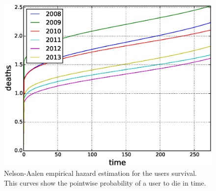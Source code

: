 \begin{figure}[!tb]
\centering
\includegraphics[scale=0.4]{./images/nelson_aalen_users.eps}
\caption{Nelson-Aalen empirical hazard estimation for the users survival. This curves show the pointwise probability of a user to die in time.}
\label{fig:nelson_aalen_users}
\end{figure}

